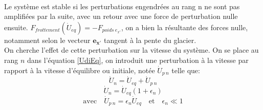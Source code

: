 \documentclass[11pt, a4paper]{article}
\begin{document}
\\Le système est stable si les perturbations engendrées au rang n ne sont pas amplifiées par la suite, avec un retour avec une force de perturbation nulle ensuite.  $F_{frottement}(\dot{U}_{eq}) = - F_{poids \ e_{x'}} $, on a bien la résultante des forces nulle, notamment selon le vecteur $\mathbf{e_{x'}}$ tangent à la pente du glacier.
\\

On cherche l'effet de cette perturbation sur la vitesse du système. On se place au rang $n$ dans l'équation \ref{UdiEq}, on introduit une perturbation à la vitesse par rapport à la vitesse d'équilibre ou initiale, notée $\dot{U}_{p \ n}$ telle que:
$$\dot{U}_{n} = \dot{U}_{eq} + \dot{U}_{p \ n} $$
\begin{equation}
	\dot{U}_{n} = \dot{U}_{eq}(1+\epsilon_n) \label{Un1Eq}
\end{equation}
$$ \text{avec} \quad \dot{U}_{p \ n} = \epsilon_n \dot{U}_{eq} \quad \text{et} \quad \epsilon_n \ll 1 $$
\\
\end{document}
